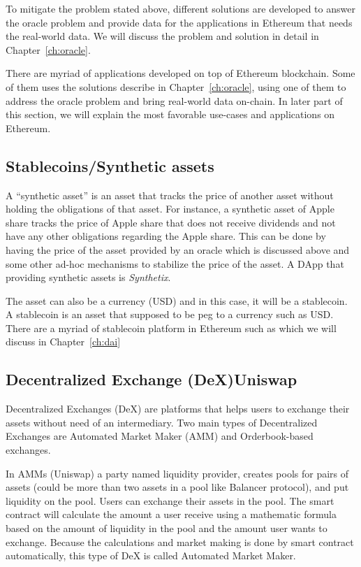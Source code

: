 To mitigate the problem stated above, different solutions are developed to answer the oracle problem and provide data for the applications in Ethereum that needs the real-world data. We will discuss the problem and solution in detail in Chapter~\ref{ch:oracle}.

There are myriad of applications developed on top of Ethereum blockchain. Some of them uses the solutions describe in  Chapter~\ref{ch:oracle}, using one of them to address the oracle problem and bring real-world data on-chain. In later part of this section, we will explain the most favorable use-cases and applications on Ethereum.

\subsection{Stablecoins/Synthetic assets \eg \dai}

A ``synthetic asset'' is an asset that tracks the price of another asset without holding the obligations of that asset. For instance, a synthetic asset of Apple share tracks the price of Apple share that does not receive dividends and not have any other obligations regarding the Apple share. This can be done by having the price of the asset provided by an oracle which is discussed above and some other ad-hoc mechanisms to stabilize the price of the asset. A DApp that providing synthetic assets is \textit{Synthetix}.

The asset can also be a currency (\eg USD) and in this case, it will be a stablecoin. A stablecoin is an asset that supposed to be peg to a currency such as USD. There are a myriad of stablecoin platform in Ethereum such as \dai which we will discuss in Chapter~\ref{ch:dai}

\subsection{Decentralized Exchange (DeX)\eg Uniswap}
Decentralized Exchanges (DeX) are platforms that helps users to exchange their assets without need of an intermediary. Two main types of Decentralized Exchanges are Automated Market Maker (AMM) and Orderbook-based exchanges. 

In AMMs (\eg Uniswap) a party named liquidity provider, creates pools for pairs of assets (could be more than two assets in a pool like Balancer protocol), and put liquidity on the pool. Users can exchange their assets in the pool. The smart contract will calculate the amount a user receive using a mathematic formula based on the amount of liquidity in the pool and the amount user wants to exchange. Because the calculations and market making is done by smart contract automatically, this type of DeX is called Automated Market Maker. 

